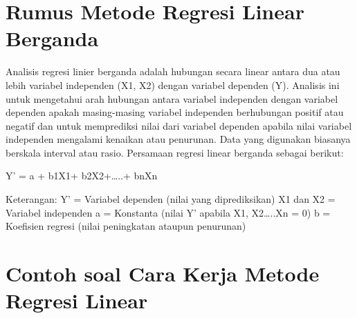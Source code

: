 \section{Rumus Metode Regresi Linear Berganda}

Analisis regresi linier berganda adalah hubungan secara linear antara dua atau lebih variabel independen (X1, X2) dengan variabel dependen (Y). Analisis ini untuk mengetahui arah hubungan antara variabel independen dengan variabel dependen apakah masing-masing variabel independen berhubungan positif atau negatif dan untuk memprediksi nilai dari variabel dependen apabila nilai variabel independen mengalami kenaikan atau penurunan. Data yang digunakan biasanya berskala interval atau rasio\citep{smadi2012least}.
                        Persamaan regresi linear berganda sebagai berikut:

Y’ = a + b1X1+ b2X2+…..+ bnXn

Keterangan:
Y’                    =   Variabel dependen (nilai yang diprediksikan)
X1 dan X2      =   Variabel independen
a                      =   Konstanta (nilai Y’ apabila X1, X2…..Xn = 0)
b                            =    Koefisien regresi (nilai peningkatan ataupun penurunan)

\newpage \section{Contoh soal Cara Kerja Metode Regresi Linear}
